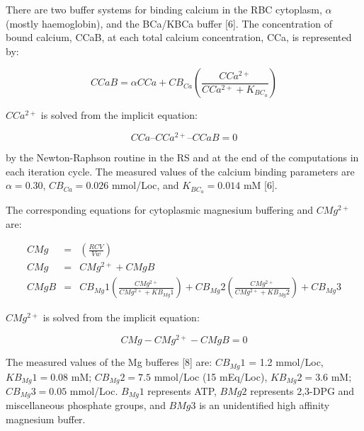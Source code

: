 \documentclass[a4paper]{article}
\newcommand{\cell}[1]{C#1}
\newcommand{\KBCa}{K_{{BC}_a}}
\newcommand{\CMgtp}{\cell{Mg^{2+}}}
\newcommand{\CCatp}{\cell{Ca^{2+}}}
\newcommand{\CCa}{\cell{Ca}}
\newcommand{\CCaB}{\cell{CaB}}
\newcommand{\CBCa}{\cell{B_{Ca}}}
\newcommand{\CMgB}{\cell{MgB}}
\newcommand{\CMg}{\cell{Mg}}
\begin{document}
There are two buffer systems for binding calcium in the RBC cytoplasm, $\alpha$ (mostly haemoglobin), and the BCa/KBCa buffer [6]. The concentration of bound calcium, CCaB, at each total calcium concentration, CCa, is represented by:

\begin{equation}
\CCaB = \alpha\CCa + \CBCa\left(\frac{\CCatp}{\CCatp + \KBCa}\right)
\end{equation}

$CCa^{2+}$ is solved from the implicit equation: 

\begin{equation}
\CCa – \CCatp – \CCaB = 0  
\end{equation}

by the Newton-Raphson routine in the RS and at the end of the computations in each iteration cycle.  The measured values of the calcium binding parameters are $\alpha = 0.30$, $\CBCa = 0.026$ mmol/Loc, and $\KBCa = 0.014$ mM [6].

The corresponding equations for cytoplasmic magnesium buffering and $CMg^{2+}$ are:

\begin{eqnarray}
\CMg &=& \left(\frac{RCV}{Vw}\right)\\
\CMg &=& \CMgtp + \CMgB\\
\CMgB &=& CB_{Mg}1\left(\frac{\CMgtp}{\CMgtp+KB_{Mg}1}\right)+CB_{Mg}2\left(\frac{\CMgtp}{\CMgtp+KB_{Mg}2}\right)+CB_{Mg}3
\end{eqnarray}

$\CMgtp$ is solved from the implicit equation: 

\begin{equation}
\CMg - \CMgtp - \CMgB = 0
\end{equation}


The measured values of the Mg bufferes [8] are: $CB_{Mg}1$ = 1.2 mmol/Loc, $KB_{Mg}1 = 0.08$ mM; $CB_{Mg}2 = 7.5$ mmol/Loc (15 mEq/Loc), $KB_{Mg}2 = 3.6$ mM; $CB_{Mg}3 = 0.05$ mmol/Loc. $B_{Mg}1$ represents ATP, $BMg2$ represents 2,3-DPG and miscellaneous phosphate groups, and $BMg3$ is an unidentified high affinity magnesium buffer.  
\end{document}
